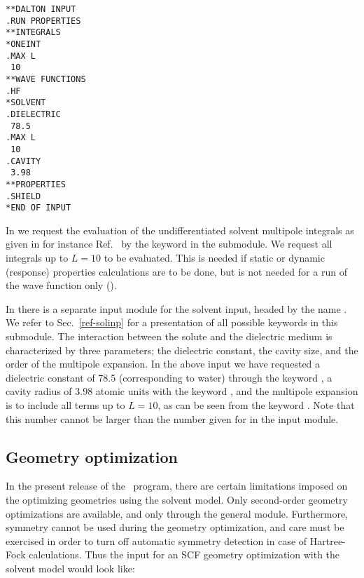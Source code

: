 \begin{verbatim}
**DALTON INPUT
.RUN PROPERTIES
**INTEGRALS
*ONEINT
.MAX L
 10
**WAVE FUNCTIONS
.HF
*SOLVENT
.DIELECTRIC
 78.5
.MAX L
 10
.CAVITY
 3.98
**PROPERTIES
.SHIELD
*END OF INPUT
\end{verbatim}

In  we request the evaluation of the undifferentiated solvent
multipole integrals as given in for instance
Ref.~\cite{kvmhahjajthjcp89} by the keyword  in the
 submodule. We request all
integrals up to $L=10$ to be evaluated. This is needed if static or
dynamic (response) properties
calculations are to be done, but is not needed for a run of the
wave function only ().

In  there is a separate input module for the
solvent input,
headed by the name . We refer to Sec.~\ref{ref-solinp}
for a presentation of all possible keywords in this submodule. The
interaction between the solute and the dielectric
medium is
characterized by three parameters; the dielectric
constant, the cavity
size, and the order of the multipole expansion. In the above input we have
requested a dielectric constant of 78.5 (corresponding to water)
through the keyword , a cavity radius of 3.98 atomic
units with the keyword , and the multipole expansion is to
include all terms up to $L=10$, as can be seen from the keyword
. Note that this number cannot be larger than the number given for
 in the  input module.

\subsection{Geometry optimization}\label{sec:solventgeoopt}

In the present release of the \siraba\ program, there are certain
limitations imposed on the optimizing geometries using the solvent
model. Only second-order geometry optimizations  are available, and
only through the general  module. Furthermore, symmetry
cannot be used during the geometry optimization, and care must be
exercised in order to turn off automatic symmetry detection in case of
Hartree-Fock calculations. Thus the input for an SCF geometry
optimization with the solvent model would look like:

